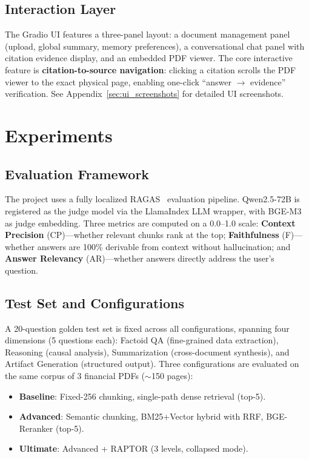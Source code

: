 \documentclass[11pt, a4paper]{article}
\begin{document}
\subsection{Interaction Layer}

The Gradio UI features a three-panel layout: a document management panel
(upload, global summary, memory preferences), a conversational chat panel with
citation evidence display, and an embedded PDF viewer. The core interactive
feature is \textbf{citation-to-source navigation}: clicking a citation scrolls
the PDF viewer to the exact physical page, enabling one-click ``answer
$\rightarrow$ evidence'' verification. See Appendix~\ref{sec:ui_screenshots}
for detailed UI screenshots.

\section{Experiments}

\subsection{Evaluation Framework}

The project uses a fully localized RAGAS~\cite{ragas} evaluation pipeline.
Qwen2.5-72B is registered as the judge model via the LlamaIndex LLM wrapper,
with BGE-M3 as judge embedding. Three metrics are computed on a 0.0--1.0 scale:
\textbf{Context Precision} (CP)---whether relevant chunks rank at the top;
\textbf{Faithfulness} (F)---whether answers are 100\% derivable from context
without hallucination; and \textbf{Answer Relevancy} (AR)---whether answers
directly address the user's question.

\subsection{Test Set and Configurations}

A 20-question golden test set is fixed across all configurations, spanning four
dimensions (5 questions each): Factoid QA (fine-grained data extraction),
Reasoning (causal analysis), Summarization (cross-document synthesis), and
Artifact Generation (structured output). Three configurations are evaluated on
the same corpus of 3 financial PDFs ($\sim$150 pages):

\begin{itemize}[nosep]
    \item \textbf{Baseline}: Fixed-256 chunking, single-path dense retrieval (top-5).
    \item \textbf{Advanced}: Semantic chunking, BM25+Vector hybrid with RRF, BGE-Reranker (top-5).
    \item \textbf{Ultimate}: Advanced + RAPTOR (3 levels, collapsed mode).
\end{itemize}
\end{document}
